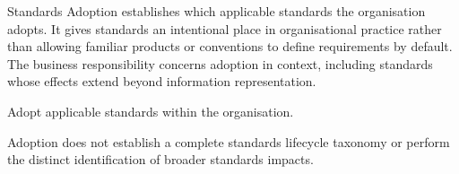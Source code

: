 Standards Adoption establishes which applicable standards the organisation adopts. It gives standards an intentional place in organisational practice rather than allowing familiar products or conventions to define requirements by default. The business responsibility concerns adoption in context, including standards whose effects extend beyond information representation.



Adopt applicable standards within the organisation.



Adoption does not establish a complete standards lifecycle taxonomy or perform the distinct identification of broader standards impacts.


